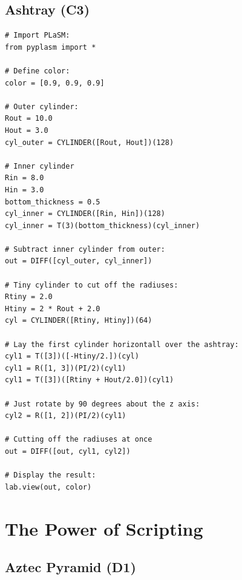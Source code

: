 \documentclass{article}
\begin{document}
\subsection{Ashtray (C3)}

\begin{verbatim}
# Import PLaSM:
from pyplasm import *

# Define color:
color = [0.9, 0.9, 0.9]

# Outer cylinder:
Rout = 10.0
Hout = 3.0
cyl_outer = CYLINDER([Rout, Hout])(128)

# Inner cylinder
Rin = 8.0
Hin = 3.0
bottom_thickness = 0.5
cyl_inner = CYLINDER([Rin, Hin])(128)
cyl_inner = T(3)(bottom_thickness)(cyl_inner)

# Subtract inner cylinder from outer:
out = DIFF([cyl_outer, cyl_inner])

# Tiny cylinder to cut off the radiuses:
Rtiny = 2.0
Htiny = 2 * Rout + 2.0
cyl = CYLINDER([Rtiny, Htiny])(64)

# Lay the first cylinder horizontall over the ashtray:
cyl1 = T([3])([-Htiny/2.])(cyl)
cyl1 = R([1, 3])(PI/2)(cyl1)
cyl1 = T([3])([Rtiny + Hout/2.0])(cyl1)

# Just rotate by 90 degrees about the z axis:
cyl2 = R([1, 2])(PI/2)(cyl1)

# Cutting off the radiuses at once
out = DIFF([out, cyl1, cyl2])
 
# Display the result:
lab.view(out, color)
\end{verbatim}








\section{The Power of Scripting}

\subsection{Aztec Pyramid (D1)}
\end{document}

